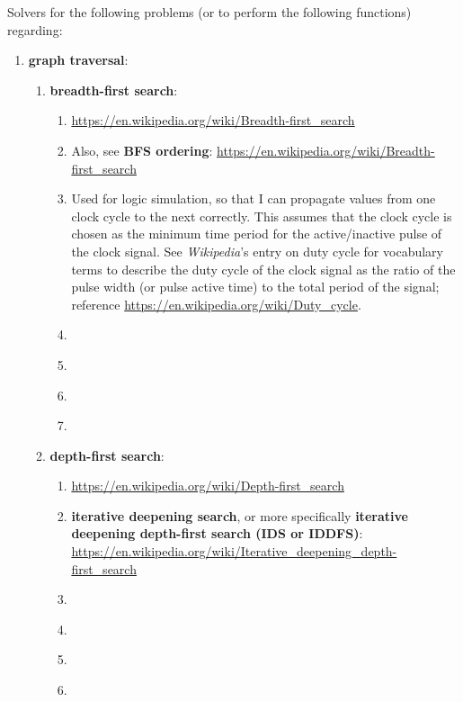 Solvers for the following problems (or to perform the following functions) regarding: \vspace{-0.3cm}
\begin{enumerate} \itemsep -4pt
\item {\bf graph traversal}: \vspace{-0.3cm}
	\begin{enumerate} \itemsep -2pt
	\item {\bf breadth-first search}: \vspace{-0.2cm}
		\begin{enumerate} \itemsep -2pt
		\item \url{https://en.wikipedia.org/wiki/Breadth-first_search	}
		\item Also, see {\bf BFS ordering}: \url{https://en.wikipedia.org/wiki/Breadth-first_search}
		\item Used for logic simulation, so that I can propagate values from one clock cycle to the next correctly. This assumes that the clock cycle is chosen as the minimum time period for the active/inactive pulse of the clock signal. See {\it Wikipedia}'s entry on duty cycle for vocabulary terms to describe the duty cycle of the clock signal as the ratio of the pulse width (or pulse active time) to the total period of the signal; reference \url{https://en.wikipedia.org/wiki/Duty_cycle}.
		\item \cite[\S53.4]{Goldman2008}
		\item \cite[\S22.2]{Cormen2009}
		\item \cite[\S13.3--\S13.4]{Goodrich2011}
		\item \cite[\S14.3.3]{Goodrich2013}
		\end{enumerate}
	\item {\bf depth-first search}: \vspace{-0.2cm}
		\begin{enumerate} \itemsep -2pt
		\item \url{https://en.wikipedia.org/wiki/Depth-first_search}
		\item {\bf iterative deepening search}, or more specifically {\bf iterative deepening depth-first search (IDS or IDDFS)}: \url{https://en.wikipedia.org/wiki/Iterative_deepening_depth-first_search}
		\item \cite[\S53.5]{Goldman2008}
		\item \cite[\S22.3]{Cormen2009}
		\item \cite[\S13.3--\S13.4]{Goodrich2011}
		\item \cite[\S14.3.1--\S14.3.2]{Goodrich2013}

\end{enumerate}
\end{enumerate}
\end{enumerate}

